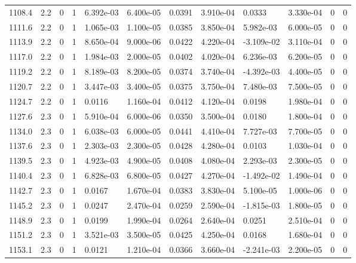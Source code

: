 \documentclass[preview]{standalone}
\begin{document}
{{{{{{{{{{{{{{{{{{{{\begin{tabular}{L{1.2cm}C{1.2cm} C{0.3cm}C{0.5cm} C{1.4cm}C{1.4cm} C{1.4cm}C{1.4cm} C{1.6cm}C{1.6cm} C{1.6cm}C{1.6cm}}
  1108.4  &   2.2  & 0     &  1 &  6.392e-03  & 6.400e-05  &  0.0391&   3.910e-04& 0.0333 & 3.330e-04   &  0 & 0  \\ 
  1111.6  &   2.2  & 0     &  1 &  1.065e-03  & 1.100e-05  &  0.0385&   3.850e-04& 5.982e-03 & 6.000e-05   &  0 & 0  \\ 
  1113.9  &   2.2  & 0     &  1 &  8.650e-04  & 9.000e-06  &  0.0422&   4.220e-04& -3.109e-02 & 3.110e-04   &  0 & 0  \\ 
  1117.0  &   2.2  & 0     &  1 &  1.984e-03  & 2.000e-05  &  0.0402&   4.020e-04& 6.236e-03 & 6.200e-05   &  0 & 0  \\ 
  1119.2  &   2.2  & 0     &  1 &  8.189e-03  & 8.200e-05  &  0.0374&   3.740e-04& -4.392e-03 & 4.400e-05   &  0 & 0  \\ 
  1120.7  &   2.2  & 0     &  1 &  3.447e-03  & 3.400e-05  &  0.0375&   3.750e-04& 7.480e-03 & 7.500e-05   &  0 & 0  \\ 
  1124.7  &   2.2  & 0     &  1 &  0.0116  & 1.160e-04  &  0.0412&   4.120e-04& 0.0198 & 1.980e-04   &  0 & 0  \\ 
  1127.6  &   2.3  & 0     &  1 &  5.910e-04  & 6.000e-06  &  0.0350&   3.500e-04& 0.0180 & 1.800e-04   &  0 & 0  \\ 
  1134.0  &   2.3  & 0     &  1 &  6.038e-03  & 6.000e-05  &  0.0441&   4.410e-04& 7.727e-03 & 7.700e-05   &  0 & 0  \\ 
  1137.6  &   2.3  & 0     &  1 &  2.303e-03  & 2.300e-05  &  0.0428&   4.280e-04& 0.0103 & 1.030e-04   &  0 & 0  \\ 
  1139.5  &   2.3  & 0     &  1 &  4.923e-03  & 4.900e-05  &  0.0408&   4.080e-04& 2.293e-03 & 2.300e-05   &  0 & 0  \\ 
  1140.4  &   2.3  & 0     &  1 &  6.828e-03  & 6.800e-05  &  0.0427&   4.270e-04& -1.492e-02 & 1.490e-04   &  0 & 0  \\ 
  1142.7  &   2.3  & 0     &  1 &  0.0167  & 1.670e-04  &  0.0383&   3.830e-04& 5.100e-05 & 1.000e-06   &  0 & 0  \\ 
  1145.2  &   2.3  & 0     &  1 &  0.0247  & 2.470e-04  &  0.0259&   2.590e-04& -1.815e-03 & 1.800e-05   &  0 & 0  \\ 
  1148.9  &   2.3  & 0     &  1 &  0.0199  & 1.990e-04  &  0.0264&   2.640e-04& 0.0251 & 2.510e-04   &  0 & 0  \\ 
  1151.2  &   2.3  & 0     &  1 &  3.521e-03  & 3.500e-05  &  0.0425&   4.250e-04& 0.0168 & 1.680e-04   &  0 & 0  \\ 
  1153.1  &   2.3  & 0     &  1 &  0.0121  & 1.210e-04  &  0.0366&   3.660e-04& -2.241e-03 & 2.200e-05   &  0 & 0  \\ 

\end{tabular}}}}}}}}}}}}}}}}}}}}}
\end{document}
